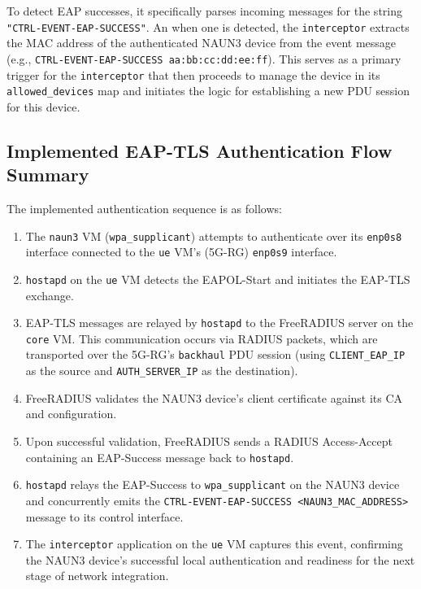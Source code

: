 To detect \ac{EAP} successes, it specifically parses incoming messages for the string \texttt{"CTRL-EVENT-EAP-SUCCESS"}. An when one is detected,  the \texttt{interceptor} extracts the \ac{MAC} address of the authenticated \ac{NAUN3} device from the event message (e.g., \texttt{CTRL-EVENT-EAP-SUCCESS aa:bb:cc:dd:ee:ff}). This serves as a primary trigger for the \texttt{interceptor} that then proceeds to manage the device in its \texttt{allowed\_devices} map and initiates the logic for establishing a new \ac{PDU} session for this device.

\subsection{Implemented \acs{EAP-TLS} Authentication Flow Summary}

The implemented authentication sequence is as follows:

\begin{enumerate}
    \item The \texttt{naun3} \ac{VM} (\texttt{wpa\_supplicant}) attempts to authenticate over its \texttt{enp0s8} interface connected to the \texttt{ue} \ac{VM}'s (\ac{5G-RG}) \texttt{enp0s9} interface.
    \item \texttt{hostapd} on the \texttt{ue} \ac{VM} detects the \ac{EAPOL}-Start and initiates the \ac{EAP-TLS} exchange.
    \item \ac{EAP-TLS} messages are relayed by \texttt{hostapd} to the FreeRADIUS server on the \texttt{core} \ac{VM}. This communication occurs via \ac{RADIUS} packets, which are transported over the \ac{5G-RG}'s \texttt{backhaul} \ac{PDU} session (using \texttt{CLIENT\_EAP\_IP} as the source and \texttt{AUTH\_SERVER\_IP} as the destination).
    \item FreeRADIUS validates the \ac{NAUN3} device's client certificate against its \ac{CA} and configuration.
    \item Upon successful validation, FreeRADIUS sends a \ac{RADIUS} Access-Accept containing an \ac{EAP}-Success message back to \texttt{hostapd}.
    \item \texttt{hostapd} relays the \ac{EAP}-Success to \texttt{wpa\_supplicant} on the \ac{NAUN3} device and concurrently emits the \texttt{CTRL-EVENT-EAP-SUCCESS <NAUN3\_MAC\_ADDRESS>} message to its control interface.
    \item The \texttt{interceptor} application on the \texttt{ue} \ac{VM} captures this event, confirming the \ac{NAUN3} device's successful local authentication and readiness for the next stage of network integration.
\end{enumerate}

